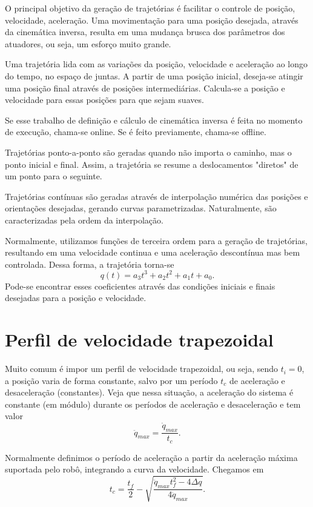 
O principal objetivo da geração de trajetórias é facilitar o controle de posição, velocidade, aceleração. Uma movimentação para uma posição desejada, através da cinemática inversa, resulta em uma mudança brusca dos parâmetros dos atuadores, ou seja, um esforço muito grande.

Uma trajetória lida com as variações da posição, velocidade e aceleração ao longo do tempo, no espaço de juntas. A partir de uma posição inicial, deseja-se atingir uma posição final através de posições intermediárias. Calcula-se a posição e velocidade para essas posições para que sejam suaves.

Se esse trabalho de definição e cálculo de cinemática inversa é feita no momento de execução, chama-se online. Se é feito previamente, chama-se offline.

Trajetórias ponto-a-ponto são geradas quando não importa o caminho, mas o ponto inicial e final. Assim, a trajetória se resume a deslocamentos "diretos" de um ponto para o seguinte.

Trajetórias contínuas são geradas através de interpolação numérica das posições e orientações desejadas, gerando curvas parametrizadas. Naturalmente, são caracterizadas pela ordem da interpolação.

Normalmente, utilizamos funções de terceira ordem para a geração de trajetórias, resultando em uma velocidade continua e uma aceleração descontínua mas bem controlada. Dessa forma, a trajetória torna-se \[
q(t) = a_3t^3 + a_2t^2 + a_1t + a_0
.\] Pode-se encontrar esses coeficientes através das condições iniciais e finais desejadas para a posição e velocidade.

\section*{Perfil de velocidade trapezoidal}

Muito comum é impor um perfil de velocidade trapezoidal, ou seja, sendo $t_i =0$, a posição varia de forma constante, salvo por um período $t_c$ de aceleração e desaceleração (constantes). Veja que nessa situação, a aceleração do sistema é constante (em módulo) durante os períodos de aceleração e desaceleração e tem valor \[
\ddot{q}_{max} = \frac{\dot{q}_{max}}{t_c}
.\]

Normalmente definimos o período de aceleração a partir da aceleração máxima suportada pelo robô, integrando a curva da velocidade. Chegamos em \[
t_c = \frac{t_f}{2} -\sqrt{\frac{\ddot{q}_{max}t_f^2 - 4\Delta q}{4 \ddot{q}_{max}}} 
.\] 


